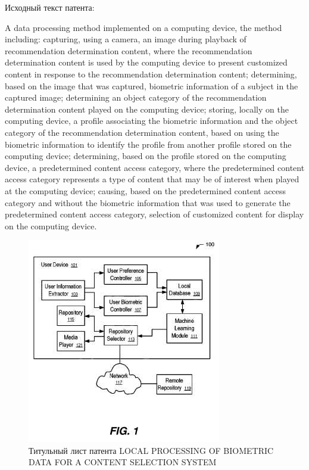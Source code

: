\documentclass[12pt]{article}
\begin{document}
    Исходный текст патента:

    A data processing method implemented on a computing device, the method including: capturing, using a camera, an image during playback of recommendation determination content, where the recommendation determination content is used by the computing device to present customized content in response to the recommendation determination content;
    determining, based on the image that was captured, biometric information of a subject in the captured image;
    determining an object category of the recommendation determination content played on the computing device;
    storing, locally on the computing device, a profile associating the biometric information and the object category of the recommendation determination content, based on using the biometric information to identify the profile from another profile stored on the computing device; determining, based on the profile stored on the computing device, a predetermined content access category, where the predetermined content access category represents a type of content that may be of interest when played at the computing device; causing, based on the predetermined content access category and without the biometric information that was used to generate the predetermined content access category, selection of customized content for display on the computing device.

    \begin{figure}[ht]
        \centering
        \includegraphics[scale=0.8]{images/4.png}
        \caption{Титульный лист патента LOCAL PROCESSING OF BIOMETRIC DATA FOR A CONTENT SELECTION SYSTEM}
        \label{fig:o:4}
    \end{figure}
\end{document}
